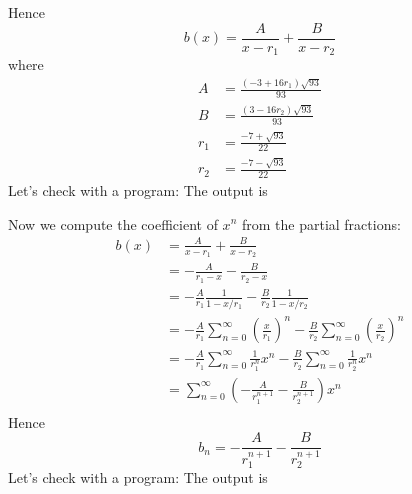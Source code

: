 Hence
\[
b(x) = \frac{A}{x - r_1} + \frac{B}{x - r_2}
\]
where
\begin{align*}
A &= \frac{(-3 + 16r_1)\sqrt{93}}{93} \\
B &= \frac{(3 - 16r_2)\sqrt{93}}{93} \\
r_1 &= \frac{-7 + \sqrt{93}}{22} \\
r_2 &= \frac{-7 - \sqrt{93}}{22}
\end{align*}
Let's check with a program:
The output is

Now we compute the coefficient of $x^n$ from the
partial fractions:
\begin{align*}
b(x)
&= \frac{A}{x - r_1} + \frac{B}{x - r_2} \\
&= -\frac{A}{r_1 - x} - \frac{B}{r_2 - x} \\
&= -\frac{A}{r_1} \frac{1}{1 - x/r_1} - \frac{B}{r_2} \frac{1}{1 - x/r_2} \\
&= -\frac{A}{r_1}\sum_{n=0}^\infty \left( \frac{x}{r_1} \right)^n
   - \frac{B}{r_2}\sum_{n=0}^\infty \left( \frac{x}{r_2} \right)^n\\
&= -\frac{A}{r_1}\sum_{n=0}^\infty  \frac{1}{r_1^n} x^n
   - \frac{B}{r_2}\sum_{n=0}^\infty \frac{1}{r_2^n} x^n\\
&= \sum_{n=0}^\infty
   \left( -\frac{A}{r_1^{n+1}}
   - \frac{B}{r_2^{n+1}}
   \right) x^n\\   
\end{align*}
Hence
\[
b_n = -\frac{A}{r_1^{n+1}} - \frac{B}{r_2^{n+1}}
\]
Let's check with a program:
The output is

